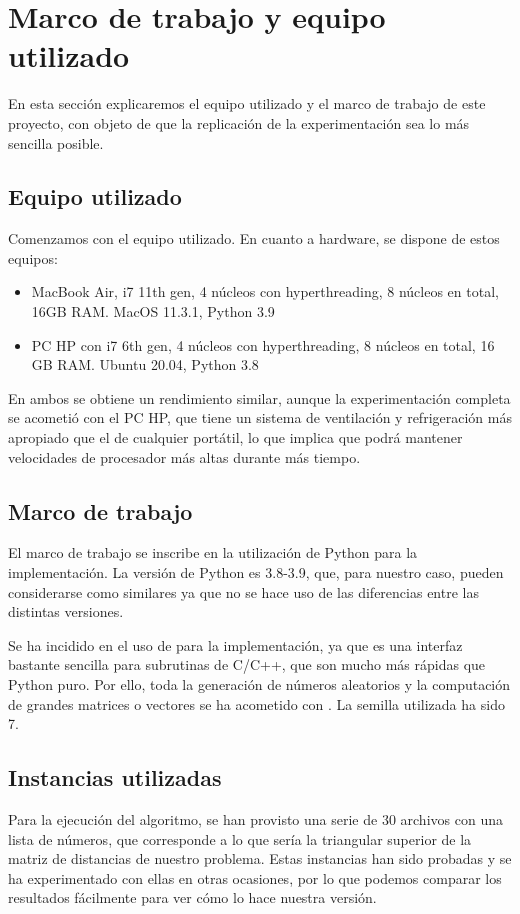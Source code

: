 \section{Marco de trabajo y equipo utilizado}
En esta sección explicaremos el equipo utilizado y el marco de trabajo de este proyecto, con objeto de que la replicación de la experimentación sea lo más sencilla posible.

\subsection{Equipo utilizado}
Comenzamos con el equipo utilizado. En cuanto a hardware, se dispone de estos equipos:

\begin{itemize}
    \item MacBook Air, i7 11th gen, 4 núcleos con hyperthreading, 8 núcleos en total, 16GB RAM. MacOS 11.3.1, Python 3.9
    \item PC HP con i7 6th gen, 4 núcleos con hyperthreading, 8 núcleos en total, 16 GB RAM. Ubuntu 20.04, Python 3.8
\end{itemize}

En ambos se obtiene un rendimiento similar, aunque la experimentación completa se acometió con el PC HP, que tiene un sistema de ventilación y refrigeración más apropiado que el de cualquier portátil, lo que implica que podrá mantener velocidades de procesador más altas durante más tiempo.

\subsection{Marco de trabajo}
El marco de trabajo se inscribe en la utilización de Python para la implementación. La versión de Python es 3.8-3.9, que, para nuestro caso, pueden considerarse como similares ya que no se hace uso de las diferencias entre las distintas versiones.

Se ha incidido en el uso de  para la implementación, ya que es una interfaz bastante sencilla para subrutinas de C/C++, que son mucho más rápidas que Python puro. Por ello, toda la generación de números aleatorios y la computación de grandes matrices o vectores se ha acometido con . La semilla utilizada ha sido 7.

\subsection{Instancias utilizadas}
Para la ejecución del algoritmo, se han provisto una serie de 30 archivos con una lista de números, que corresponde a lo que sería la triangular superior de la matriz de distancias de nuestro problema. Estas instancias han sido probadas y se ha experimentado con ellas en otras ocasiones, por lo que podemos comparar los resultados fácilmente para ver cómo lo hace nuestra versión.


